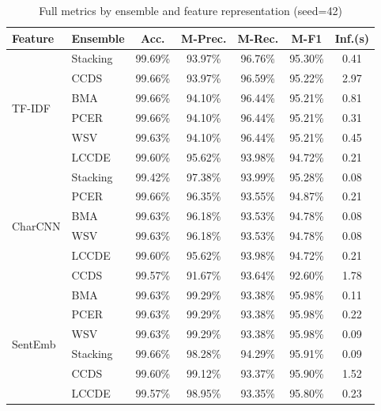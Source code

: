 \documentclass[11pt,a4paper]{article}
\begin{document}
\begin{table}[ht]
\centering
\caption{Full metrics by ensemble and feature representation (seed=42)}
\label{tab:fullmetrics}
\setlength{\tabcolsep}{4pt}
\begin{tabular}{llccccc}
\toprule
\textbf{Feature} & \textbf{Ensemble} & \textbf{Acc.} & \textbf{M-Prec.} & \textbf{M-Rec.} & \textbf{M-F1} & \textbf{Inf.(s)} \\
\midrule
\multirow{6}{*}{TF-IDF}
  & Stacking     & 99.69\% & 93.97\% & 96.76\% & 95.30\% & 0.41 \\
  & CCDS         & 99.66\% & 93.97\% & 96.59\% & 95.22\% & 2.97 \\
  & BMA         & 99.66\% & 94.10\% & 96.44\% & 95.21\% & 0.81 \\
  & PCER         & 99.66\% & 94.10\% & 96.44\% & 95.21\% & 0.31 \\
  & WSV          & 99.63\% & 94.10\% & 96.44\% & 95.21\% & 0.45 \\
  & LCCDE        & 99.60\% & 95.62\% & 93.98\% & 94.72\% & 0.21 \\
\midrule
\multirow{6}{*}{CharCNN}
  & Stacking     & 99.42\% & 97.38\% & 93.99\% & 95.28\% & 0.08 \\
  & PCER         & 99.66\% & 96.35\% & 93.55\% & 94.87\% & 0.21 \\
  & BMA         & 99.63\% & 96.18\% & 93.53\% & 94.78\% & 0.08 \\
  & WSV          & 99.63\% & 96.18\% & 93.53\% & 94.78\% & 0.08 \\
  & LCCDE        & 99.60\% & 95.62\% & 93.98\% & 94.72\% & 0.21 \\
  & CCDS         & 99.57\% & 91.67\% & 93.64\% & 92.60\% & 1.78 \\
\midrule
\multirow{6}{*}{SentEmb}
  & BMA         & 99.63\% & 99.29\% & 93.38\% & 95.98\% & 0.11 \\
  & PCER         & 99.63\% & 99.29\% & 93.38\% & 95.98\% & 0.22 \\
  & WSV          & 99.63\% & 99.29\% & 93.38\% & 95.98\% & 0.09 \\
  & Stacking     & 99.66\% & 98.28\% & 94.29\% & 95.91\% & 0.09 \\
  & CCDS         & 99.60\% & 99.12\% & 93.37\% & 95.90\% & 1.52 \\
  & LCCDE        & 99.57\% & 98.95\% & 93.35\% & 95.80\% & 0.23 \\
\bottomrule
\end{tabular}
\end{table}
\end{document}
